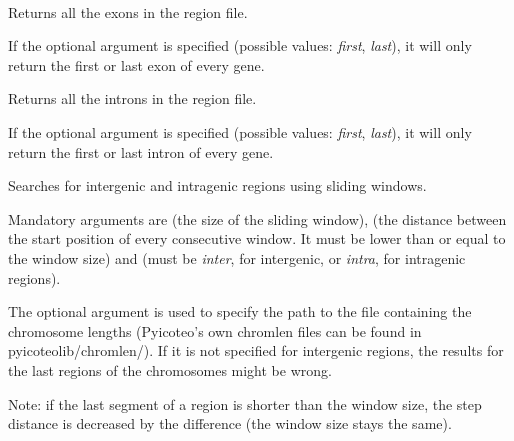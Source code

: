 \documentclass[letterpaper,10pt,english]{sphinxmanual}
\begin{document}
\begin{fulllineitems}
\label{pyicoregion:cmdoption--region-magic}~

\begin{fulllineitems}
Returns all the exons in the region file.

If the optional argument \code{{[}position{]}} is specified (possible values: \emph{first}, \emph{last}), it will only return the first or last exon of every gene.

\end{fulllineitems}



\begin{fulllineitems}
Returns all the introns in the region file.

If the optional argument \code{{[}position{]}} is specified (possible values: \emph{first}, \emph{last}), it will only return the first or last intron of every gene.

\end{fulllineitems}



\begin{fulllineitems}
Searches for intergenic and intragenic regions using sliding windows.

Mandatory arguments are  (the size of the sliding window),  (the distance between the start position of every consecutive window. It must be lower than or equal to the window size) and  (must be \emph{inter}, for intergenic, or \emph{intra}, for intragenic regions).

The optional argument  is used to specify the path to the file containing the chromosome lengths (Pyicoteo's own chromlen files can be found in pyicoteolib/chromlen/). If it is not specified for intergenic regions, the results for the last regions of the chromosomes might be wrong.

Note: if the last segment of a region is shorter than the window size, the step distance is decreased by the difference (the window size stays the same).


\end{fulllineitems}
\end{fulllineitems}
\end{document}
